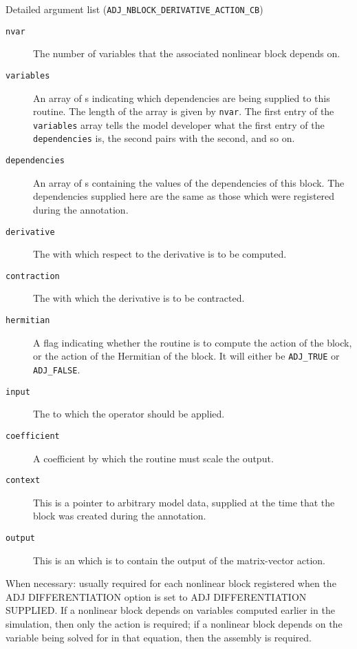 \begin{boxwithtitle}{Detailed argument list (\texttt{ADJ_NBLOCK_DERIVATIVE_ACTION_CB})}
\begin{description}
\item[\texttt{nvar}] The number of variables that the associated nonlinear block depends on.
\item[\texttt{variables}] An array of s indicating which dependencies are being supplied to this routine. The length of the
array is given by \texttt{nvar}. The first entry of the \texttt{variables} array
tells the model developer what the first entry of the \texttt{dependencies} is, the second pairs with the second, and so on.
\item[\texttt{dependencies}] An array of s containing the values of the dependencies of this block. The dependencies supplied
here are the same as those which were registered during the annotation.
\item[\texttt{derivative}] The  with which respect to the derivative is to be computed.
\item[\texttt{contraction}] The  with which the derivative is to be contracted.  
\item[\texttt{hermitian}] A flag indicating whether the routine is to compute the action of the block, or the action of the Hermitian of the
block. It will either be \texttt{ADJ_TRUE} or \texttt{ADJ_FALSE}.
\item[\texttt{input}] The  to which the operator should be applied.
\item[\texttt{coefficient}] A coefficient by which the routine must scale the output.
\item[\texttt{context}] This is a pointer to arbitrary model data, supplied at the time that the block was created during the annotation.
\item[\texttt{output}] This is an  which is to contain the output of the matrix-vector action.
\end{description}
\end{boxwithtitle}

When necessary: usually required for each nonlinear block registered when the
ADJ DIFFERENTIATION option is set to ADJ DIFFERENTIATION SUPPLIED. If a nonlinear
block depends on variables computed earlier in the simulation, then only the action is
required; if a nonlinear block depends on the variable being solved for in that equation,
then the assembly is required.


